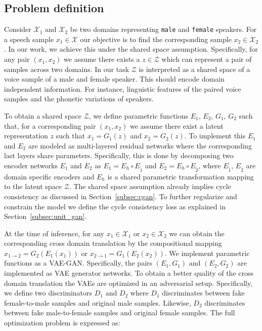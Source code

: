 \subsection{Problem definition}
\label{sec:prob_defn}
Consider $\mathcal{X}_1$ and $\mathcal{X}_2$ be two domains representing \texttt{male} and \texttt{female} speakers. For a speech sample $x_1\in \mathcal{X}$ our objective is to find the corresponding sample $x_2\in \mathcal{X}_2$. In our work, we achieve this under the shared space assumption. Specifically, for any pair $(x_1,x_2)$ we assume there exists a $z\in \mathcal{Z}$ which can represent a pair of samples across two domains. In our task $\mathcal{Z}$ is interpreted as a shared space of a voice sample of a male and female speaker. This should encode domain independent information. For instance, linguistic features of the paired voice samples and the phonetic variations of speakers. 

To obtain a shared space $\mathcal{Z}$, we define parametric functions $E_1$, $E_2$, $G_1$, $G_2$ such that, for a corresponding pair $(x_1,x_2)$ we assume there exist a latent representation $z$ such that $x_1=G_1(z)$ and $x_2=G_2(z)$. To implement this $E_1$ and $E_2$ are modeled as multi-layered residual networks where the corresponding last layers share parameters. Specifically, this is done by decomposing two encoder networks $E_1$ and $E_2$ as $E_1 = E_h\circ E_{\tilde{1}}$ and $E_2 = E_h\circ E_{\tilde{2}}$, where $E_{\tilde{1}}$, $E_{\tilde{2}}$ are domain specific encoders and $E_h$ is a shared parametric transformation mapping to the latent space $\mathcal{Z}$.
The shared space assumption already implies cycle consistency as discussed in Section~\ref{subsec:cgan}. To further regularize and constrain the model we define the cycle consistency loss as explained in Section~\ref{subsec:unit_gan}.

At the time of inference, for any $x_1\in \mathcal{X}_1$ or $x_2\in \mathcal{X}_2$ we can obtain the corresponding cross domain translation by the compositional mapping $x_{1\rightarrow2} = G_2(E_1(x_1))$ or $x_{2\rightarrow1} = G_1(E_2(x_2))$. We implement parametric functions as a VAE-GAN. Specifically, the pairs $(E_1,G_1)$ and $(E_2, G_2)$ are implemented as VAE generator networks. To obtain a better quality of the cross domain translation the VAEs are optimized in an adversarial setup. Specifically, we define two discriminators $D_1$ and $D_2$ where $D_1$ discriminates between fake female-to-male samples and original male samples. Likewise, $D_2$ discriminates between fake male-to-female samples and original female samples. The full optimization problem is expressed as:

